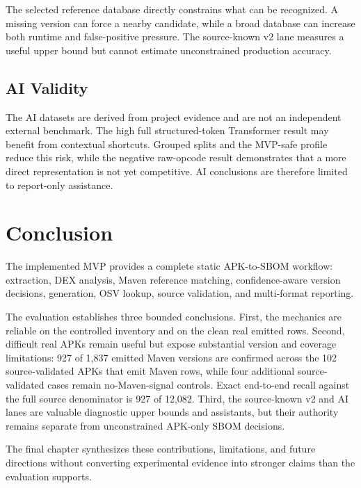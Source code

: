 The selected reference database directly constrains what can be recognized.
A missing version can force a nearby candidate, while a broad database can
increase both runtime and false-positive pressure. The source-known v2 lane
measures a useful upper bound but cannot estimate unconstrained production
accuracy.

\subsection{AI Validity}

The AI datasets are derived from project evidence and are not an independent
external benchmark. The high full structured-token Transformer result may
benefit from contextual shortcuts. Grouped splits and the MVP-safe profile
reduce this risk, while the negative raw-opcode result demonstrates that a
more direct representation is not yet competitive. AI conclusions are
therefore limited to report-only assistance.

\section{Conclusion}

The implemented MVP provides a complete static APK-to-SBOM workflow:
extraction, DEX analysis, Maven reference matching, confidence-aware version
decisions, \CycloneDX generation, OSV lookup, source validation, and
multi-format reporting.

The evaluation establishes three bounded conclusions. First, the mechanics are
reliable on the controlled inventory and on the clean real emitted rows.
Second, difficult real APKs remain useful but expose substantial version and
coverage limitations: 927 of 1,837 emitted Maven versions are confirmed across
the 102 source-validated APKs that emit Maven rows, while four additional
source-validated cases remain no-Maven-signal controls. Exact end-to-end recall
against the full source denominator is 927 of 12,082. Third, the source-known
v2 and AI lanes are valuable diagnostic upper bounds and assistants, but their
authority remains separate from unconstrained APK-only SBOM decisions.

The final chapter synthesizes these contributions, limitations, and future
directions without converting experimental evidence into stronger claims than
the evaluation supports.
